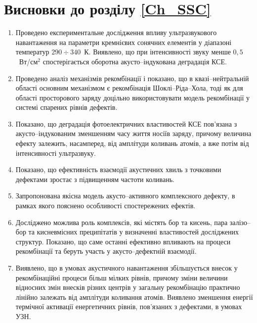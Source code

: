 \section*{Висновки до розділу \ref{Ch_SSC}}
  \begin{enumerate}
     \item Проведено експериментальне дослідження впливу ультразвукового навантаження на параметри кремнієвих сонячних елементів
     у діапазоні температур $290\div340$~К.
     Виявлено, що при інтенсивності звуку менше $0,5$~Вт/см$^2$ спостерігається оборотна акусто--індукована деградація КСЕ.

     \item Проведено аналіз механізмів рекомбінації і показано, що в квазі--нейтральній області основним механізмом є рекомбінація Шоклі--Ріда--Хола,
     тоді як для області просторового заряду доцільно використовувати модель рекомбінації у системі спарених рівнів дефектів.

     \item Показано, що деградація фотоелектричних властивостей КСЕ пов'язана з акусто--індукованим зменшенням часу життя носіїв заряду,
     причому величина ефекту залежить, насамперед, від амплітуди коливань атомів, а вже потім від інтенсивності ультразвуку.

     \item Показано, що ефективність взаємодії акустичних хвиль з точковими дефектами зростає з підвищенням частоти коливань.

     \item Запропонована якісна модель акусто--активного комплексного дефекту, в рамках якого пояснено особливості спостережених ефектів.

     \item Досліджено можлива роль комплексів, які містять бор та кисень,
      пара залізо--бор та кисневмісних преципітатів у визначенні властивостей досліджених структур.
      Показано, що саме останні ефективно впливають на процеси рекомбінації та беруть участь у акусто--дефектній взаємодії.

     \item Виявлено, що в умовах акустичного навантаження збільшується внесок у рекомбінаційні процеси більш мілких рівнів, причому зміни величини відносних змін внесків різних центрів у загальну рекомбінацію практично лінійно залежать від амплітуди коливання атомів.
         Виявлено зменшення енергії термічної активації енергетичних рівнів, пов'язаних з дефектами, в умовах УЗН.


\end{enumerate}
